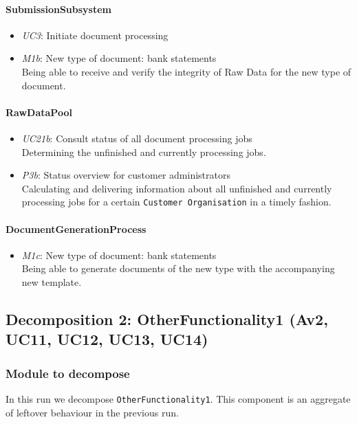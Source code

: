 \documentclass[a4paper,10pt]{article}
\begin{document}
\paragraph{SubmissionSubsystem}
\begin{itemize}
    \item \emph{UC3}: Initiate document processing
    \item \emph{M1b}: New type of document: bank statements\\
    Being able to receive and verify the integrity of Raw Data for the new type of document.
\end{itemize}

\paragraph{RawDataPool}
\begin{itemize}
    \item \emph{UC21b}: Consult status of all document processing jobs\\
    Determining the unfinished and currently processing jobs.
    \item \emph{P3b}: Status overview for customer administrators\\
    Calculating and delivering information about all unfinished and currently processing jobs for a certain \texttt{Customer Organisation} in a timely fashion.
\end{itemize}

\paragraph{DocumentGenerationProcess}
\begin{itemize}
    \item \emph{M1c}: New type of document: bank statements\\
    Being able to generate documents of the new type with the accompanying new template.
\end{itemize}

\subsection{Decomposition 2: OtherFunctionality1 (Av2, UC11, UC12, UC13, UC14)}
\subsubsection{Module to decompose}
In this run we decompose \texttt{OtherFunctionality1}. This component is an aggregate of leftover behaviour in the previous run.
\end{document}
